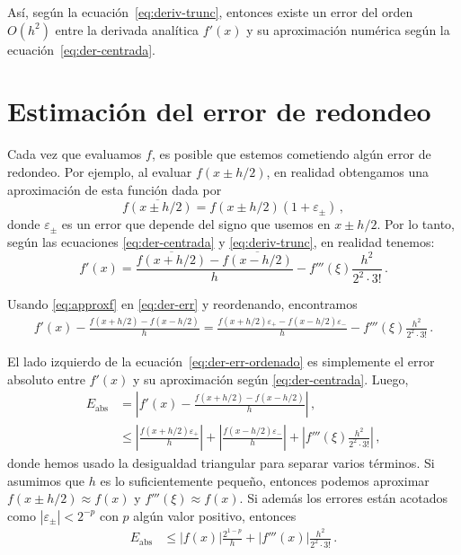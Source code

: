 \documentclass[../portafolio.tex]{subfiles}
\begin{document}
Así, según la ecuación~\eqref{eq:deriv-trunc}, entonces existe un error del orden $O(h^2)$ entre la derivada analítica $f'(x)$ y su aproximación numérica según la ecuación~\eqref{eq:der-centrada}.

\section{Estimación del error de redondeo}
Cada vez que evaluamos $f$, es posible que estemos cometiendo algún error de redondeo. Por ejemplo, al evaluar $f(x\pm h/2)$, en realidad obtengamos una aproximación de esta función dada por
\begin{equation}
  \label{eq:approxf}
  \overline{f(x\pm h/2)} = f(x\pm h/2) (1 + \varepsilon_\pm)\,,
\end{equation}
%
donde $\varepsilon_\pm$ es un error que depende del signo que usemos en $x\pm h/2$. Por lo tanto, según las ecuaciones \eqref{eq:der-centrada} y \eqref{eq:deriv-trunc}, en realidad tenemos:
\begin{equation}
  \label{eq:der-err}
  f'(x) = \frac{\overline{f(x+h/2)} - \overline{f(x-h/2)}}{h} - f'''(\xi) \frac{h^2}{2^2\cdot 3!} \,.
\end{equation}

Usando \eqref{eq:approxf} en \eqref{eq:der-err} y reordenando, encontramos
\begin{align}
  \label{eq:der-err-ordenado}
  f'(x) - \frac{f(x+ h/2) - f(x- h/2)}{h} = \frac{f(x+ h/2)\varepsilon_+ - f(x- h/2) \varepsilon_-}{h} - f'''(\xi) \frac{h^2}{2^2\cdot 3!} \,.
\end{align}

El lado izquierdo de la ecuación~\eqref{eq:der-err-ordenado} es simplemente el error absoluto entre $f'(x)$ y su aproximación según \eqref{eq:der-centrada}. Luego,
\begin{align}
  E_\text{abs}
  &= \left|f'(x) - \frac{f(x+ h/2) - f(x- h/2)}{h}\right| \,, \label{eq:def-err-abs}
  \\
  &\leq
    \left|\frac{f(x+ h/2)\varepsilon_+}{h}\right| +
    \left|\frac{f(x- h/2)\varepsilon_-}{h}\right| +
    \left|f'''(\xi) \frac{h^2}{2^2\cdot 3!} \right| \,,
\end{align}
%
donde hemos usado la desigualdad triangular para separar varios términos. Si asumimos que $h$ es lo suficientemente pequeño, entonces podemos aproximar $f(x\pm h/2)\approx f(x)$ y $f'''(\xi)\approx f(x)$. Si además los errores están acotados como $|\varepsilon_\pm|<2^{-p}$ con $p$ algún valor positivo, entonces
\begin{align}
  \label{eq:err-abs-cent}
  E_\text{abs}
  &\leq
    \left|f(x)\right|\frac{2^{1-p}}{h} +
    \left|f'''(x)\right| \frac{h^2}{2^2\cdot 3!}  \,.
\end{align}
\end{document}
